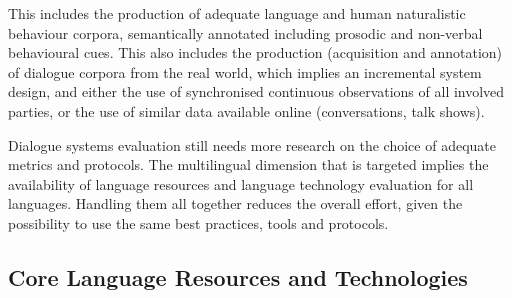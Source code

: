 \documentclass[10pt, plain]{../../metanetpaper}
\begin{document}
\begin{multicols}{2}
This includes the production of adequate language and human naturalistic behaviour corpora, semantically annotated including prosodic and non-verbal behavioural cues. This also includes the production (acquisition and annotation) of dialogue corpora from the real world, which implies an incremental system design, and either the use of synchronised continuous observations of all involved parties, or the use of similar data available online (conversations, talk shows).
 
Dialogue systems evaluation still needs more research on the choice of adequate metrics and protocols. The multilingual dimension that is targeted implies the availability of language resources and language technology evaluation for all languages. Handling them all together reduces the overall effort, given the possibility to use the same best practices, tools and protocols.

\subsection{Core Language Resources and Technologies}
\label{sec:sharing-resources-and-results}

%




\end{multicols}
\end{document}
